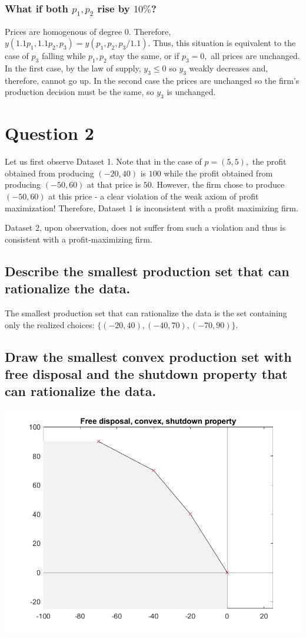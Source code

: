 \documentclass[11pt]{article} %
\begin{document}
\subsubsection{What if both $p_1,p_2$ rise by $10\%$?}
Prices are homogenous of degree 0. Therefore, $y(1.1 p_1,1.1 p_2,p_3) = y(p_1,p_2,p_3 /1.1) $. Thus, this situation is equivalent to the case of $p_3$ falling while $p_1,p_2$ stay the same, or if $p_3 = 0,$ all prices are unchanged. In the first case, by the law of supply, $y_3 \leq 0$ so $y_3$ weakly decreases and, therefore, cannot go up. In the second case the prices are unchanged so the firm's production decision must be the same, so $y_3$ is unchanged.

\section{Question 2}
Let us first observe Dataset 1. Note that in the case of $p=(5,5),$ the profit obtained from producing $(-20,40)$ is $100$ while the profit obtained from producing $(-50,60)$ at that price is $50$. However, the firm chose to produce $(-50,60)$ at this price - a clear violation of the weak axiom of profit maximization! Therefore, Dataset 1 is inconsistent with a profit maximizing firm.

Dataset 2, upon observation, does not suffer from such a violation and thus is consistent with a profit-maximizing firm. 
\subsection{Describe the smallest production set that can rationalize the data.}
The smallest production set that can rationalize the data is the set containing only the realized choices: $\{ (-20,40),(-40,70),(-70,90)\}$.

\subsection{Draw the smallest convex production set with free disposal and the shutdown property that can rationalize the data.}
\includegraphics{freedispshutdown}
\end{document}
